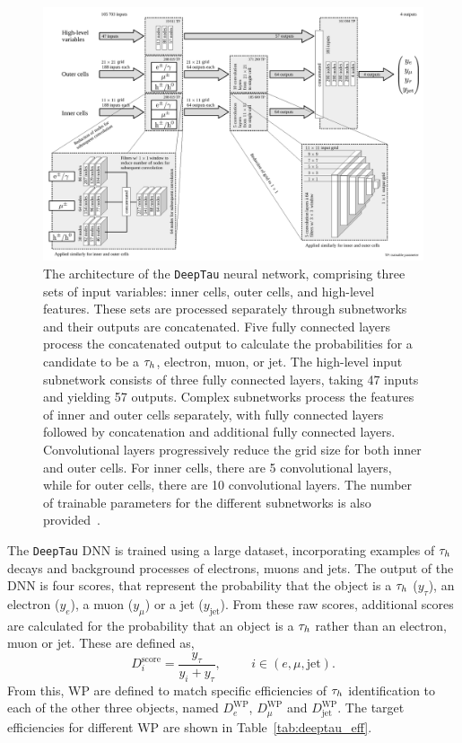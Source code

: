 \begin{figure}[p!]
\centering
    \includegraphics[width=\textwidth]{Figures/deeptau.pdf}
\caption[Diagram of the architecture of the \texttt{DeepTau} neural network.]{The architecture of the \texttt{DeepTau} neural network, comprising three sets of input variables: inner cells, outer cells, and high-level features. These sets are processed separately through subnetworks and their outputs are concatenated. Five fully connected layers process the concatenated output to calculate the probabilities for a candidate to be a $\tau_{h}$, electron, muon, or jet. The high-level input subnetwork consists of three fully connected layers, taking 47 inputs and yielding 57 outputs. Complex subnetworks process the features of inner and outer cells separately, with fully connected layers followed by concatenation and additional fully connected layers. Convolutional layers progressively reduce the grid size for both inner and outer cells. For inner cells, there are 5 convolutional layers, while for outer cells, there are 10 convolutional layers. The number of trainable parameters for the different subnetworks is also provided~\cite{CMS:2022prd}.}
\label{fig:deeptau}
\end{figure}

The \texttt{DeepTau} \ac{DNN} is trained using a large dataset, incorporating examples of $\tau_{h}$ decays and background processes of electrons, muons and jets. 
The output of the \ac{DNN} is four scores, that represent the probability that the object is a $\tau_{h}$ ($y_\tau$), an electron ($y_e$), a muon ($y_\mu$) or a jet ($y_{\text{jet}}$).
From these raw scores, additional scores are calculated for the probability that an object is a $\tau_{h}$ rather than an electron, muon or jet.
These are defined as,
\begin{equation}
D_{i}^{\text{score}} = \frac{y_\tau}{y_i + y_{\tau}}, \hspace{1cm} i \in (e,\mu,\text{jet}).
\end{equation}
From this, \ac{WP} are defined to match specific efficiencies of $\tau_{h}$ identification to each of the other three objects, named $D_{e}^{\text{WP}}$, $D_{\mu}^{\text{WP}}$ and $D_{\text{jet}}^{\text{WP}}$.
The target efficiencies for different \ac{WP} are shown in Table~\ref{tab:deeptau_eff}. \\


